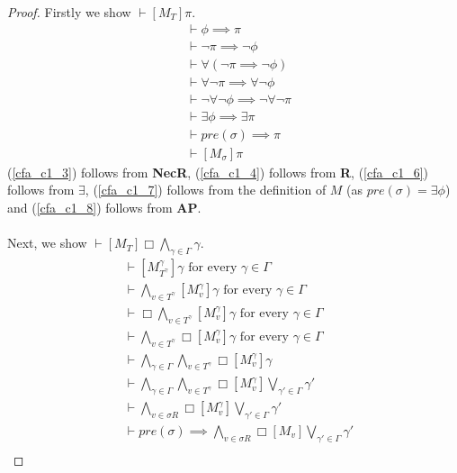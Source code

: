 \documentclass[12pt, a4paper, titlepage]{scrartcl}
\numberwithin{equation}{section}
\newcommand{\sqex}[1]{[{#1}]}
\newcommand{\axAP}{{\bf AP}}
\newcommand{\axR}{{\bf R}}
\newcommand{\axNecR}{{\bf NecR}}
\begin{document}
\begin{proof}
Firstly we show $\vdash \sqex{M_T} \pi$.
\begin{align}
	& \vdash \phi \implies \pi \label{cfa_c1_1} \\
	& \vdash \neg \pi \implies \neg \phi \label{cfa_c1_2}\\
	& \vdash \forall (\neg \pi \implies \neg \phi) \label{cfa_c1_3}\\
	& \vdash \forall \neg \pi \implies \forall \neg \phi \label{cfa_c1_4}\\
	& \vdash \neg \forall \neg \phi \implies \neg \forall \neg \pi \label{cfa_c1_5}\\
	& \vdash \exists \phi \implies \exists \pi \label{cfa_c1_6}\\
	& \vdash pre(\sigma) \implies \pi \label{cfa_c1_7}\\
	& \vdash \sqex{M_\sigma} \pi \label{cfa_c1_8}
\end{align}
(\ref{cfa_c1_3}) follows from \axNecR, (\ref{cfa_c1_4}) follows from \axR, (\ref{cfa_c1_6}) follows from
$\exists$, (\ref{cfa_c1_7}) follows from the definition of $M$ (as $pre(\sigma) = \exists \phi$) and
(\ref{cfa_c1_8}) follows from \axAP.\\
\\
Next, we show $\vdash \sqex{M_T} \Box \bigwedge_{\gamma \in \Gamma} \gamma$.
\begin{align}
	& \vdash \sqex{M^{\gamma}_{T^{\gamma}}} \gamma \text{ for every }\gamma \in \Gamma
	\label{cfa_c2_1} \\
	& \vdash \bigwedge_{v \in T^\gamma} \sqex{M^\gamma_v} \gamma \text{ for every }\gamma \in \Gamma\label{cfa_c2_1} \\
	& \vdash \Box \bigwedge_{v \in T^\gamma} \sqex{M^\gamma_v} \gamma \text{ for every } \gamma \in \Gamma\label{cfa_c2_2} \\
	& \vdash \bigwedge_{v \in T^\gamma} \Box \sqex{M^\gamma_v} \gamma \text{ for every } \gamma \in \Gamma\label{cfa_c2_3} \\
	& \vdash \bigwedge_{\gamma \in \Gamma} \bigwedge_{v \in T^\gamma} \Box \sqex{M^\gamma_v} \gamma\label{cfa_c2_4} \\
	& \vdash \bigwedge_{\gamma \in \Gamma} \bigwedge_{v \in T^\gamma} \Box \sqex{M^\gamma_v}
	\bigvee_{\gamma' \in \Gamma} \gamma'\label{cfa_c2_5} \\
	& \vdash \bigwedge_{v \in \sigma R} \Box \sqex{M^\gamma_v}\bigvee_{\gamma' \in \Gamma} \gamma'\label{cfa_c2_6} \\
	& \vdash pre(\sigma) \implies \bigwedge_{v \in \sigma R} \Box \sqex{M_v} \bigvee_{\gamma' \in \Gamma} \gamma'\label{cfa_c2_7} \\

\end{align}
\end{proof}
\end{document}
